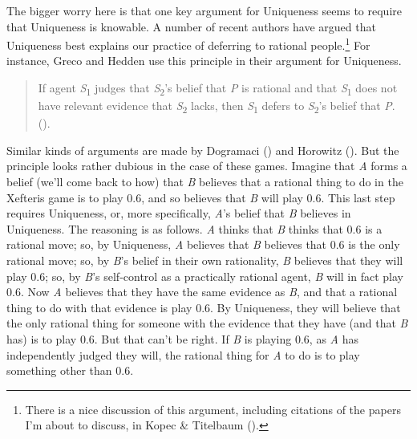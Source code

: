 \documentclass[
  12pt,
  letterpaper,
  DIV=11,
  numbers=noendperiod]{scrreprt}
\begin{document}
The bigger worry here is that one key argument for Uniqueness seems to
require that Uniqueness is knowable. A number of recent authors have
argued that Uniqueness best explains our practice of deferring to
rational people.\footnote{There is a nice discussion of this argument,
  including citations of the papers I'm about to discuss, in Kopec \&
  Titelbaum ().} For
instance, Greco and Hedden use this principle in their argument for
Uniqueness.

\begin{quote}
If agent \emph{S}\textsubscript{1} judges that
\emph{S}\textsubscript{2}'s belief that \emph{P} is rational and that
\emph{S}\textsubscript{1} does not have relevant evidence that
\emph{S}\textsubscript{2} lacks, then \emph{S}\textsubscript{1} defers
to \emph{S}\textsubscript{2}'s belief that \emph{P}.
().
\end{quote}

Similar kinds of arguments are made by Dogramaci
() and Horowitz
(). But the principle looks rather
dubious in the case of these games. Imagine that \emph{A} forms a belief
(we'll come back to how) that \emph{B} believes that a rational thing to
do in the Xefteris game is to play 0.6, and so believes that \emph{B}
will play 0.6. This last step requires Uniqueness, or, more
specifically, \emph{A}'s belief that \emph{B} believes in Uniqueness.
The reasoning is as follows. \emph{A} thinks that \emph{B} thinks that
0.6 is a rational move; so, by Uniqueness, \emph{A} believes that
\emph{B} believes that 0.6 is the only rational move; so, by \emph{B}'s
belief in their own rationality, \emph{B} believes that they will play
0.6; so, by \emph{B}'s self-control as a practically rational agent,
\emph{B} will in fact play 0.6. Now \emph{A} believes that they have the
same evidence as \emph{B}, and that a rational thing to do with that
evidence is play 0.6. By Uniqueness, they will believe that the only
rational thing for someone with the evidence that they have (and that
\emph{B} has) is to play 0.6. But that can't be right. If \emph{B} is
playing 0.6, as \emph{A} has independently judged they will, the
rational thing for \emph{A} to do is to play something other than 0.6.
\end{document}
